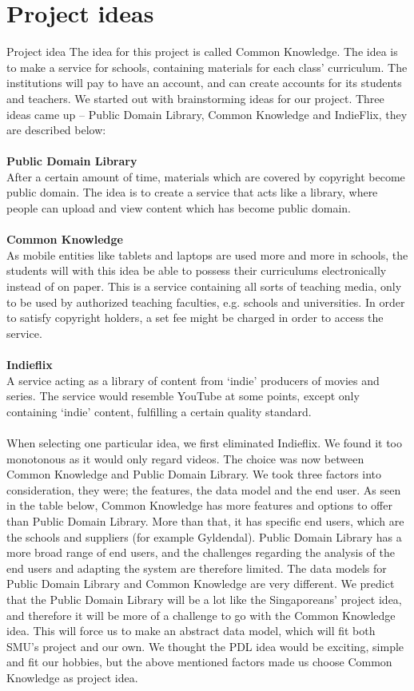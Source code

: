 \documentclass[10pt,a4paper]{article}
\begin{document}
\section{Project ideas}
Project idea 
The idea for this project is called Common Knowledge. The idea is to make a service for schools, containing materials for each class’ curriculum. The institutions will pay to have an account, and can create accounts for its students and teachers.
We started out with brainstorming ideas for our project. Three ideas came up – Public Domain Library, Common Knowledge and IndieFlix, they are described below:\\\\
{\bfseries Public Domain Library}\\
After a certain amount of time, materials which are covered by copyright become public domain. The idea is to create a service that acts like a library, where people can upload and view content which has become public domain.\\\\
{\bfseries Common Knowledge}\\
As mobile entities like tablets and laptops are used more and more in schools, the students will with this idea be able to possess their curriculums electronically instead of on paper. This is a service containing all sorts of teaching media, only to be used by authorized teaching faculties, e.g. schools and universities. In order to satisfy copyright holders, a set fee might be charged in order to access the service.\\\\
{\bfseries Indieflix}\\
A service acting as a library of content from ‘indie’ producers of movies and series. The service would resemble YouTube at some points, except only containing ‘indie’ content, fulfilling a certain quality standard.\\\\
When selecting one particular idea, we first eliminated Indieflix. We found it too monotonous as it would only regard videos. The choice was now between Common Knowledge and Public Domain Library.  We took three factors into consideration, they were; the features, the data model and the end user. As seen in the table below, Common Knowledge has more features and options to offer than Public Domain Library. More than that, it has specific end users, which are the schools and suppliers (for example Gyldendal). Public Domain Library has a more broad range of end users, and the challenges regarding the analysis of the end users and adapting the system are therefore limited. The data models for Public Domain Library and Common Knowledge are very different. We predict that the Public Domain Library will be a lot like the Singaporeans’ project idea, and therefore it will be more of a challenge to go with the Common Knowledge idea. This will force us to make an abstract data model, which will fit both SMU’s project and our own. We thought the PDL idea would be exciting, simple and fit our hobbies, but the above mentioned factors made us choose Common Knowledge as project idea.\\
\end{document}
